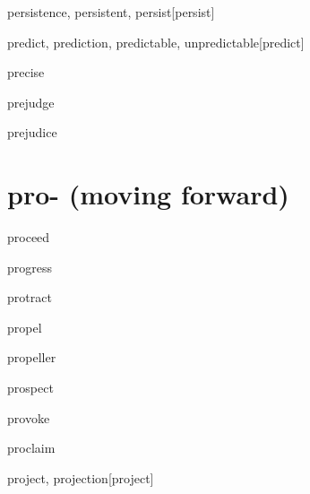 \begin{RefWord}{persistence, persistent, persist}[persist]
\end{RefWord}




\begin{RefWord}{predict, prediction, predictable, unpredictable}[predict]
\end{RefWord}

\begin{RefWord}{precise}
\end{RefWord}

\begin{RefWord}{prejudge}
\end{RefWord}

\begin{RefWord}{prejudice}
\end{RefWord}

\section{pro- (moving forward)}

\begin{RefWord}{proceed}
\end{RefWord}

\begin{RefWord}{progress}
\end{RefWord}

\begin{RefWord}{protract}
\end{RefWord}

\begin{RefWord}{propel}
\end{RefWord}

\begin{RefWord}{propeller}
\end{RefWord}

\begin{RefWord}{prospect}
\end{RefWord}

\begin{RefWord}{provoke}
\end{RefWord}

\begin{RefWord}{proclaim}
\end{RefWord}

\begin{RefWord}{project, projection}[project]
\end{RefWord}

